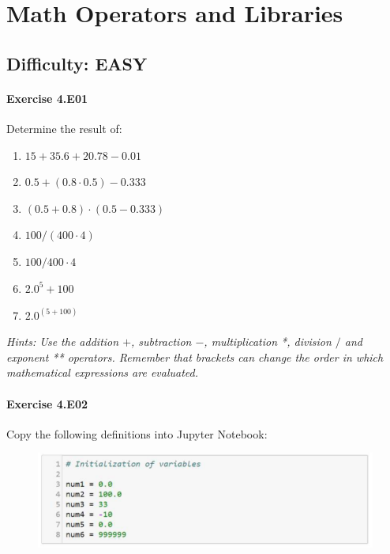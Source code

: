 \chapter{Math Operators and Libraries}\label{CHAP_MathOperators}

\section{Difficulty: EASY}

\subsubsection*{Exercise 4.E01}
Determine the result of:
\begin{enumerate}[label=(\alph*)]
	\item $15 + 35.6 + 20.78 - 0.01$
	\item $0.5 + (0.8 \cdot 0.5) - 0.333$
	\item $(0.5 + 0.8) \cdot (0.5 - 0.333)$
	\item $100 / (400 \cdot 4)$
	\item $100/ 400 \cdot 4$
	\item $2.0^5 + 100$
	\item $2.0^{(5 + 100)}$
\end{enumerate}

\textit{Hints:
Use the addition $+$, subtraction $-$, multiplication *, division $/$ and exponent ** operators. Remember that brackets can change the order in which mathematical expressions are evaluated.}\\[1cm]



\newpage
\subsubsection*{Exercise 4.E02}
Copy the following definitions into Jupyter Notebook:
\begin{figure}[H]
		\centering
		\includegraphics[width=\textwidth]{../IMG/4E02.png} 
\end{figure}


